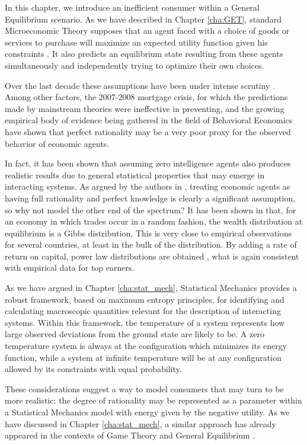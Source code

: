 In this chapter, we introduce an inefficient consumer within a General Equilibrium scenario. As we have described in Chapter \ref{cha:GET}, standard Microeconomic Theory supposes that an agent faced with a choice of goods or services to purchase will maximize an expected utility function given his constraints \cite{mascolell}. It also predicts an equilibrium state resulting from these agents simultaneously and independently trying to optimize their own choices. 

Over the last decade these assumptions have been under
intense scrutiny \cite{bouchaud2008, KirmanBook}. Among other factors, the
2007-2008 mortgage crisis, for which the predictions made by
mainstream theories were ineffective in preventing, and the growing
empirical body of evidence being gathered in the field of Behavioral
Economics have shown that perfect rationality may be a very poor
proxy for the observed behavior of economic agents.

In fact, it has been shown that assuming zero
intelligence agents also produces realistic results \cite{Gode1993, Smith2003}
due to general statistical properties that may emerge in interacting
systems. As argued by the authors in \cite{Smith2003}, treating economic
agents as having full rationality and perfect knowledge is clearly a
significant assumption, so why not model the other end of the
spectrum?  It has been shown in \cite{Yakovenko00}
that, for an economy in which trades occur in a random fashion, the
wealth distribution at equilibrium is a Gibbs distribution. This is very close to
empirical observations for several countries, at least in the bulk of the distribution. By adding a rate of return on capital,
power law distributions are obtained \cite{Bouchaud2000}, what is again consistent with
empirical data for top earners.

As we have argued in Chapter \ref{cha:stat_mech}, Statistical Mechanics provides a robust framework, based on maximum entropy principles, for identifying and calculating macroscopic quantities relevant for the description of interacting  systems.
Within this framework, the temperature of a system represents how large observed
deviations from the ground state are likely to be. A zero temperature system is always at the configuration
which minimizes its energy function, while a system at infinite
temperature will be at any configuration allowed by its constraints with equal probability.

These considerations suggest a way to model consumers that may turn to be more realistic: the degree of rationality may be represented as a parameter within a Statistical Mechanics model with energy given by the negative utility. As we have discussed in Chapter \ref{cha:stat_mech}, a similar approach has already appeared in the contexts of Game Theory \cite{brock2001a, brock2001b, Blume93}
and General Equilibrium  \cite{Foley94, Foley96}. 

